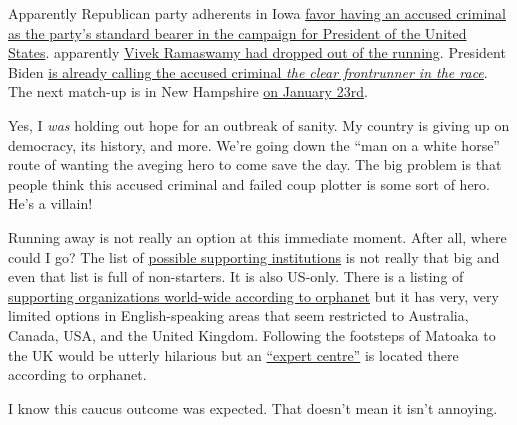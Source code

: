 Apparently Republican party adherents in Iowa
\href{https://web.archive.org/web/20240116055624/https://www.france24.com/en/americas/20240116-donald-trump-projected-to-win-iowa-republicans-caucuses}{favor
having an accused criminal as the party's standard bearer in the
campaign for President of the United States}. apparently
\href{https://web.archive.org/web/20240116031827/https://news.sky.com/story/donald-trump-projected-to-win-iowa-caucuses-13049306}{Vivek
Ramaswamy had dropped out of the running}. President Biden
\href{https://web.archive.org/web/20240116060245/https://www.dw.com/en/iowa-caucus-donald-trump-wins-first-republican-contest/live-67991224}{is
already calling the accused criminal \emph{the clear frontrunner in the
race}}. The next match-up is in New Hampshire
\href{https://web.archive.org/web/20240116060554/https://www3.nhk.or.jp/nhkworld/en/news/20240116_22/}{on
January 23rd}.

Yes, I \emph{was} holding out hope for an outbreak of sanity. My country
is giving up on democracy, its history, and more. We're going down the
``man on a white horse'' route of wanting the aveging hero to come save
the day. The big problem is that people think this accused criminal and
failed coup plotter is some sort of hero. He's a villain!

Running away is not really an option at this immediate moment. After
all, where could I go? The list of
\href{https://rarediseases.org/rare-disease-centers-of-excellence/}{possible
supporting institutions} is not really that big and even that list is
full of non-starters. It is also US-only. There is a listing of
\href{https://www.orpha.net/consor/cgi-bin/SupportGroup_Search_Simple.php?lng=EN&LnkId=21218&Typ=Pat&fdp=y&from=rightMenu}{supporting
organizations world-wide according to orphanet} but it has very, very
limited options in English-speaking areas that seem restricted to
Australia, Canada, USA, and the United Kingdom. Following the footsteps
of Matoaka to the UK would be utterly hilarious but an
\href{https://www.royalmarsden.nhs.uk/our-consultants-units-and-wards/clinical-units/cancer-genetics-unit}{``expert
centre''} is located there according to orphanet.

I know this caucus outcome was expected. That doesn't mean it isn't
annoying.
